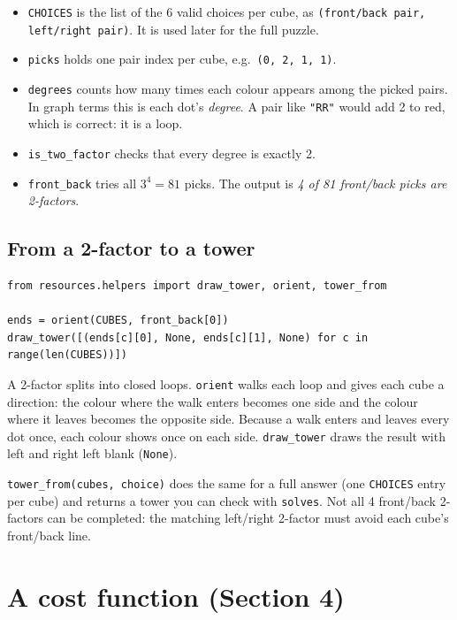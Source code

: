 \documentclass[11pt]{article}
\newcommand{\code}[1]{\texttt{#1}}
\begin{document}
\begin{itemize}
  \item \code{CHOICES} is the list of the 6 valid choices per cube, as
        \code{(front/back pair, left/right pair)}. It is used later for the full
        puzzle.
  \item \code{picks} holds one pair index per cube, e.g.\ \code{(0, 2, 1, 1)}.
  \item \code{degrees} counts how many times each colour appears among the
        picked pairs. In graph terms this is each dot's \emph{degree}. A pair
        like \code{"RR"} would add 2 to red, which is correct: it is a loop.
  \item \code{is\_two\_factor} checks that every degree is exactly 2.
  \item \code{front\_back} tries all $3^4 = 81$ picks. The output is
        \emph{4 of 81 front/back picks are 2-factors}.
\end{itemize}

\subsection{From a 2-factor to a tower}

\begin{lstlisting}
from resources.helpers import draw_tower, orient, tower_from

ends = orient(CUBES, front_back[0])
draw_tower([(ends[c][0], None, ends[c][1], None) for c in range(len(CUBES))])
\end{lstlisting}

A 2-factor splits into closed loops. \code{orient} walks each loop and gives
each cube a direction: the colour where the walk enters becomes one side and
the colour where it leaves becomes the opposite side. Because a walk enters and
leaves every dot once, each colour shows once on each side.
\code{draw\_tower} draws the result with left and right left blank (\code{None}).

\code{tower\_from(cubes, choice)} does the same for a full answer (one
\code{CHOICES} entry per cube) and returns a tower you can check with
\code{solves}. Not all 4 front/back 2-factors can be completed: the matching
left/right 2-factor must avoid each cube's front/back line.

\section{A cost function (Section 4)}
\end{document}
